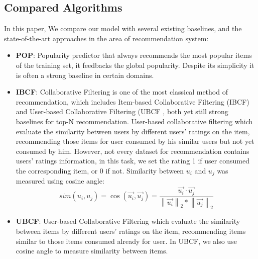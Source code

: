 \documentclass[runningheads]{llncs}
\begin{document}
\subsection{Compared Algorithms}
In this paper, We compare our model with several existing baselines, and the state-of-the-art approaches in the area of recommendation system:

 \begin{itemize}
\item \textbf{POP}: Popularity predictor that always recommends the most popular items of the training set, it feedbacks the global popularity. Despite its simplicity it is often a strong baseline in certain domains.
\item \textbf{IBCF}: Collaborative Filtering is one of the most classical method of recommendation, which includes Item-based Collaborative Filtering (IBCF) \cite{2}and User-based Collaborative Filtering (UBCF \cite{1}, both yet still strong baselines for top-N recommendation. User-based collaborative filtering which evaluate the similarity between users by different users’ ratings on the item, recommending those items for user consumed by his similar users but not yet consumed by him. However, not every dataset for recommendation contains users' ratings information, in this task, we set the rating 1 if user consumed the corresponding item, or 0 if not. Similarity between $u_{i}$ and $u_{j}$ was measured using cosine angle:
\begin{equation}
sim(u_{i},u_{j})=\cos (\vec{u_{i}},\vec{u_{j}})=\frac{\vec{u_{i}}\cdot \vec{u_{j}}}{\left \| \vec{u_{i}} \right \|_{2}\ast \left \| \vec{u_{j}} \right \|_{2}}
\end{equation}

\item \textbf{UBCF}: User-based Collaborative Filtering which evaluate the similarity between items by different users’ ratings on the item, recommending items similar to those items consumed already for user. In UBCF, we also use cosine angle to measure similarity between items.
\end{itemize}
\end{document}
